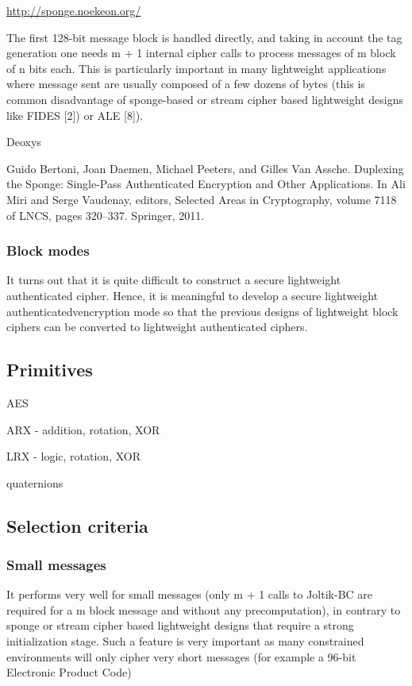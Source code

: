 \url{http://sponge.noekeon.org/}

The first 128-bit message block is handled directly, and taking in account the tag generation one needs m + 1 internal cipher calls to process messages of m block of n bits each. This is particularly important in many lightweight applications where message sent are usually composed of a few dozens of bytes (this is common disadvantage of sponge-based or stream cipher based lightweight designs like FIDES [2]) or ALE [8]).

Deoxys

Guido Bertoni, Joan Daemen, Michael Peeters, and Gilles Van Assche. Duplexing the Sponge: Single-Pass
Authenticated Encryption and Other Applications. In Ali Miri and Serge Vaudenay, editors, Selected Areas
in Cryptography, volume 7118 of LNCS, pages 320–337. Springer, 2011.

\subsubsection{Block modes}

It turns out that it is quite difficult to construct a secure lightweight authenticated cipher. Hence, it is meaningful to develop a secure lightweight authenticatedvencryption mode so that the previous designs of lightweight block ciphers can be converted to lightweight authenticated ciphers.

\subsection{Primitives}

AES

ARX - addition, rotation, XOR

LRX - logic, rotation, XOR

quaternions

\subsection{Selection criteria}

\subsubsection{Small messages}

It performs very well for small messages (only m + 1 calls to Joltik-BC are required for a m
block message and without any precomputation), in contrary to sponge or stream cipher based
lightweight designs that require a strong initialization stage. Such a feature is very important
as many constrained environments will only cipher very short messages (for example a 96-bit
Electronic Product Code)

